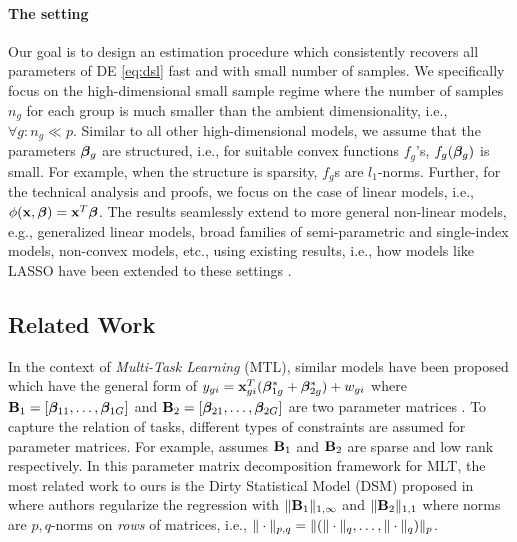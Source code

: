 \paragraph{The setting} Our goal is to design an estimation procedure which consistently recovers all parameters of DE \cref{eq:dsl} fast and with small number of samples.
We specifically focus on the high-dimensional small sample regime where the number of samples $n_g$ for each group is much smaller than the ambient 
dimensionality, i.e., $\forall g: n_g \ll p$. Similar to all other high-dimensional models, we assume that the parameters $\boldsymbol{\beta}_g$ are structured, i.e., for suitable convex functions $f_g$'s, $f_g(\boldsymbol{\beta}_g)$ is small.
For example, when the structure is sparsity, $f_g$s are $l_1$-norms. Further, for the technical analysis and proofs,
we focus on the case of linear models, i.e., $\phi(\mathbf{x},\boldsymbol{\beta}) = \mathbf{x}^T \boldsymbol{\beta}$. The results
seamlessly extend to more general non-linear models, e.g., generalized linear models, broad families of semi-parametric and single-index models, non-convex models, etc., using
existing results, i.e., how models like LASSO have been extended to these settings \cite{negahban2012restricted}. %


\subsection{Related Work}
In the context of \emph{Multi-Task Learning} (MTL), similar models have been proposed which have the general form of $y_{gi} = \mathbf{x}_{gi}^T (\boldsymbol{\beta}_{1g}^* + \boldsymbol{\beta}^*_{2g}) + w_{gi}$ where $\mathbf{B}_1 = [\boldsymbol{\beta}_{11}, \dots, \boldsymbol{\beta}_{1G}]$ and $\mathbf{B}_2 = [\boldsymbol{\beta}_{21}, \dots, \boldsymbol{\beta}_{2G}]$ are two parameter matrices \cite{Zhang2017-rm}. To capture the relation of tasks, different types of constraints are assumed for parameter matrices. For example, \cite{Chen2012-fb} assumes $\mathbf{B}_1$ and $\mathbf{B}_2$ are sparse and low rank respectively. In this parameter matrix decomposition framework for MLT, the most related work to ours is the Dirty Statistical Model (DSM) proposed in \cite{jrsr10} where authors regularize the regression with $\|\mathbf{B}_1\|_{1, \infty}$ and $\|\mathbf{B}_2\|_{1,1}$ where norms are $p,q$-norms on \emph{rows} of matrices, i.e., $\|\cdot\|_{p,q} = \|(\|\cdot\|_{q}, \dots, \|\cdot\|_{q})\|_{p}$. 

